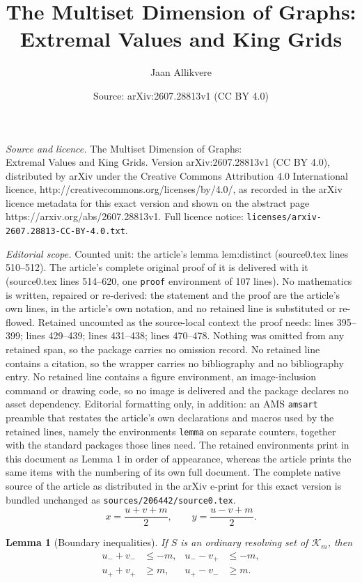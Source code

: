 \documentclass[10pt,a4paper]{amsart}
\title{The Multiset Dimension of Graphs:\\ Extremal Values and King Grids}
\author{Jaan Allikvere}
\date{Source: arXiv:2607.28813v1 (CC BY 4.0)}
\newtheorem{lemma}{Lemma}
\newcommand{\King}{\mathcal K}
\begin{document}
\maketitle

\noindent\emph{Source and licence.} The Multiset Dimension of Graphs:\\ Extremal Values and King Grids. Version arXiv:2607.28813v1 (CC BY 4.0), distributed by arXiv under the Creative Commons Attribution 4.0 International licence, http://creativecommons.org/licenses/by/4.0/, as recorded in the arXiv licence metadata for this exact version and shown on the abstract page https://arxiv.org/abs/2607.28813v1. Full licence notice: \texttt{licenses/arxiv-2607.28813-CC-BY-4.0.txt}.\par\smallskip

\noindent\textit{Editorial scope.} Counted unit: the article's lemma lem:distinct (source0.tex lines 510--512). The article's complete original proof of it is delivered with it (source0.tex lines 514--620, one \texttt{proof} environment of 107 lines). No mathematics is written, repaired or re-derived: the statement and the proof are the article's own lines, in the article's own notation, and no retained line is substituted or re-flowed.  Retained uncounted as the source-local context the proof needs: lines 395--399; lines 429--439; lines 431--438; lines 470--478.  Nothing was omitted from any retained span, so the package carries no omission record.  No retained line contains a citation, so the wrapper carries no bibliography and no bibliography entry.  No retained line contains a figure environment, an image-inclusion command or drawing code, so no image is delivered and the package declares no asset dependency.  Editorial formatting only, in addition: an AMS \texttt{amsart} preamble that restates the article's own declarations and macros used by the retained lines, namely the environments \texttt{lemma} on separate counters, together with the standard packages those lines need.  The retained environments print in this document as Lemma 1 in order of appearance, whereas the article prints the same items with the numbering of its own full document.  The complete native source of the article as distributed in the arXiv e-print for this exact version is bundled unchanged as \texttt{sources/206442/source0.tex}.
\begin{equation}\label{eq:inverse}
 x=\frac{u+v+m}{2},
 \qquad
 y=\frac{u-v+m}{2}.
\end{equation}

\begin{lemma}[Boundary inequalities]\label{lem:boundary}
If $S$ is an ordinary resolving set of $\King_m$, then
\begin{equation}\label{eq:boundaryineq}
\begin{aligned}
 u_-+v_-&\le -m, &
 u_- -v_+&\le -m,\\
 u_++v_+&\ge m, &
 u_+-v_-&\ge m.
\end{aligned}
\end{equation}
\end{lemma}
\end{document}
